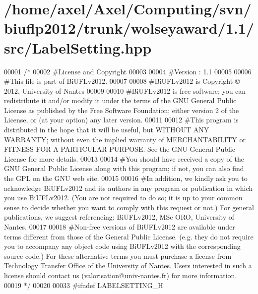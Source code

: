 \hypertarget{LabelSetting_8hpp_source}{\section{/home/axel/\-Axel/\-Computing/svn/biuflp2012/trunk/wolseyaward/1.1/src/\-Label\-Setting.hpp}
}

\begin{DoxyCode}
00001 \textcolor{comment}{/*}
00002 \textcolor{comment}{ #License and Copyright}
00003 \textcolor{comment}{ }
00004 \textcolor{comment}{ #Version : 1.1}
00005 \textcolor{comment}{ }
00006 \textcolor{comment}{ #This file is part of BiUFLv2012.}
00007 \textcolor{comment}{ }
00008 \textcolor{comment}{ #BiUFLv2012 is Copyright © 2012, University of Nantes}
00009 \textcolor{comment}{ }
00010 \textcolor{comment}{ #BiUFLv2012 is free software; you can redistribute it and/or modify it under
       the terms of the GNU General Public License as published by the Free Software
       Foundation; either version 2 of the License, or (at your option) any later version.}
00011 \textcolor{comment}{ }
00012 \textcolor{comment}{ #This program is distributed in the hope that it will be useful, but WITHOUT
       ANY WARRANTY; without even the implied warranty of MERCHANTABILITY or FITNESS FOR
       A PARTICULAR PURPOSE. See the GNU General Public License for more details.}
00013 \textcolor{comment}{ }
00014 \textcolor{comment}{ #You should have received a copy of the GNU General Public License along with
       this program; if not, you can also find the GPL on the GNU web site.}
00015 \textcolor{comment}{ }
00016 \textcolor{comment}{ #In addition, we kindly ask you to acknowledge BiUFLv2012 and its authors in
       any program or publication in which you use BiUFLv2012. (You are not required to
       do so; it is up to your common sense to decide whether you want to comply with
       this request or not.) For general publications, we suggest referencing: 
       BiUFLv2012, MSc ORO, University of Nantes.}
00017 \textcolor{comment}{ }
00018 \textcolor{comment}{ #Non-free versions of BiUFLv2012 are available under terms different from
       those of the General Public License. (e.g. they do not require you to accompany any
       object code using BiUFLv2012 with the corresponding source code.) For these
       alternative terms you must purchase a license from Technology Transfer Office of the
       University of Nantes. Users interested in such a license should contact us
       (valorisation@univ-nantes.fr) for more information.}
00019 \textcolor{comment}{ */}
00020 
00033 \textcolor{preprocessor}{#ifndef LABELSETTING\_H}

\end{DoxyCode}
